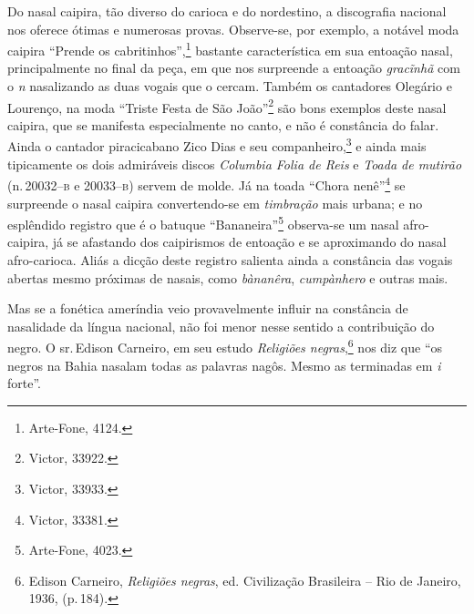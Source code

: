 Do nasal caipira, tão diverso do carioca e do nordestino, a discografia
nacional nos oferece ótimas e numerosas provas. Observe-se, por exemplo,
a notável moda caipira ``Prende os cabritinhos'',\footnote{Arte-Fone, 4124.}
bastante característica em sua entoação nasal, principalmente no final
da peça, em que nos surpreende a entoação \textit{gracĩnhã} com o \textit{n}
nasalizando as duas vogais que o cercam. Também os cantadores Olegário e
Lourenço, na moda ``Triste Festa de São João''\footnote{Victor, 33922.} são bons
exemplos deste nasal caipira, que se manifesta especialmente no canto, e
não é constância do falar. Ainda o cantador piracicabano Zico Dias e seu
companheiro,\footnote{Victor, 33933.} e ainda mais tipicamente os dois admiráveis
discos \textit{Columbia Folia de Reis} e \textit{Toada de mutirão} (n.\,20032--\textsc{b} e
20033--\textsc{b}) servem de molde. Já na toada ``Chora nenê''\footnote{Victor, 33381.} se
surpreende o nasal caipira convertendo-se em \textit{timbração} mais urbana; e no
esplêndido registro que é o batuque ``Bananeira''\footnote{Arte-Fone, 4023.}
observa-se um nasal afro-caipira, já se afastando dos caipirismos de
entoação e se aproximando do nasal afro-carioca. Aliás a dicção deste
registro salienta ainda a constância das vogais abertas mesmo próximas
de nasais, como \textit{bànanêra}, \textit{cumpànhero} e outras mais.

Mas se a fonética ameríndia veio provavelmente influir na constância de
nasalidade da língua nacional, não foi menor nesse sentido a
contribuição do negro. O sr.\,Edison Carneiro, em seu estudo \textit{Religiões
negras},\footnote{Edison Carneiro, \textit{Religiões negras}, ed. Civilização Brasileira -- Rio
de Janeiro, 1936, (p.\,184).} nos diz que ``os negros na Bahia nasalam todas as palavras
nagôs. Mesmo as terminadas em \textit{i} forte''.

